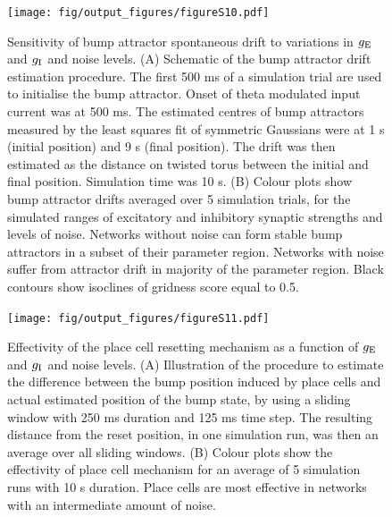 \documentclass[a4paper,12pt]{article}
\newcommand{\ssc}[3]{\ensuremath{#1_{\text{#2}_{\text{#3}}}}}
\newcommand{\gE      }{\ssc{g}      {\scriptsize{E}}{}}
\newcommand{\gI      }{\ssc{g}      {\scriptsize{I}}{}}
\begin{document}
\begin{figure}[ht!]
    \internallinenumbers
    \centering
        \texttt{[image: fig/output\_figures/figureS10.pdf]}
    \caption{Sensitivity of bump attractor spontaneous drift to
    variations in $\gE$ and $\gI$ and noise levels. (A) Schematic
    of the bump attractor drift estimation procedure. The first 500 ms of a
    simulation trial are used to initialise the bump attractor. Onset of theta
    modulated input current was at 500 ms. The estimated centres of bump
    attractors measured by the least squares fit of symmetric Gaussians were at
    1 s (initial position) and 9 s (final position). The drift was then
    estimated as the distance on twisted torus between the initial and final
    position. Simulation time was 10 s. (B) Colour plots show bump
    attractor drifts averaged over 5 simulation trials, for the simulated
    ranges of excitatory and inhibitory synaptic strengths and levels of noise.
    Networks without noise can form stable bump attractors in a subset of
    their parameter region. Networks with noise suffer from attractor drift in
    majority of the parameter region. Black contours show isoclines of gridness
    score equal to 0.5.}
\end{figure}

\clearpage

\begin{figure}[ht!]
    \internallinenumbers
    \centering
        \texttt{[image: fig/output\_figures/figureS11.pdf]}
    \caption{Effectivity of the place cell resetting mechanism as a function of
    $\gE$ and $\gI$ and noise levels. (A) Illustration of the procedure to
    estimate the difference between the bump position induced by place cells
    and actual estimated position of the bump state, by using a sliding window
    with 250 ms duration and 125 ms time step. The resulting distance from the
    reset position, in one simulation run, was then an average over all sliding
    windows. (B) Colour plots show the effectivity of place cell mechanism for
    an average of 5 simulation runs with 10 s duration. Place cells are most
    effective in networks with an intermediate amount of noise.}
    \label{fig:S_pc_effectivity}
\end{figure}

\clearpage
\end{document}
